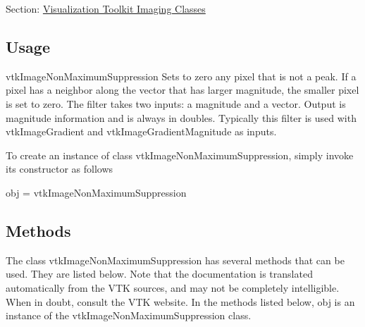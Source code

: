 Section\-: \hyperlink{sec_vtkimaging}{Visualization Toolkit Imaging Classes} \hypertarget{vtkwidgets_vtkxyplotwidget_Usage}{}\subsection{Usage}\label{vtkwidgets_vtkxyplotwidget_Usage}
vtk\-Image\-Non\-Maximum\-Suppression Sets to zero any pixel that is not a peak. If a pixel has a neighbor along the vector that has larger magnitude, the smaller pixel is set to zero. The filter takes two inputs\-: a magnitude and a vector. Output is magnitude information and is always in doubles. Typically this filter is used with vtk\-Image\-Gradient and vtk\-Image\-Gradient\-Magnitude as inputs.

To create an instance of class vtk\-Image\-Non\-Maximum\-Suppression, simply invoke its constructor as follows \begin{DoxyVerb}  obj = vtkImageNonMaximumSuppression
\end{DoxyVerb}
 \hypertarget{vtkwidgets_vtkxyplotwidget_Methods}{}\subsection{Methods}\label{vtkwidgets_vtkxyplotwidget_Methods}
The class vtk\-Image\-Non\-Maximum\-Suppression has several methods that can be used. They are listed below. Note that the documentation is translated automatically from the V\-T\-K sources, and may not be completely intelligible. When in doubt, consult the V\-T\-K website. In the methods listed below, {\ttfamily obj} is an instance of the vtk\-Image\-Non\-Maximum\-Suppression class. 
